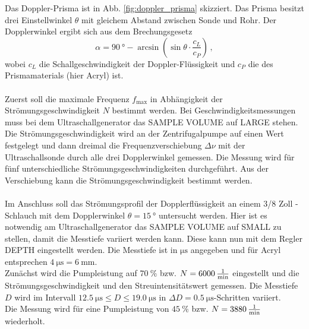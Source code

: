 Das Doppler-Prisma ist in Abb. \ref{fig:doppler_prisma} skizziert.
Das Prisma besitzt drei Einstellwinkel $\theta$ mit gleichem Abstand zwischen Sonde und Rohr.
Der Dopplerwinkel ergibt sich aus dem Brechungsgesetz
\begin{equation}
    \alpha = \SI{90}{\degree} - \arcsin \left( \sin \theta \cdot \frac{c_L}{c_P} \right) \, ,
    \label{eqn:dopplerwinkel}
\end{equation}
wobei $c_L$ die Schallgeschwindigkeit der Doppler-Flüssigkeit und $c_P$ die des Prismamaterials (hier Acryl) ist.
\\
\\
Zuerst soll die maximale Frequenz $f_\text{max}$ in Abhängigkeit der Strömungsgeschwindigkeit $N$ bestimmt werden.
Bei Geschwindigkeitsmessungen muss bei dem Ultraschallgenerator das SAMPLE VOLUME auf LARGE stehen.
Die Strömungsgeschwindigkeit wird an der Zentrifugalpumpe auf einen Wert festgelegt und dann dreimal die Frequenzverschiebung $\Delta \nu$ mit der Ultraschallsonde durch alle drei Dopplerwinkel gemessen.
Die Messung wird für fünf unterschiedliche Strömungsgeschwindigkeiten durchgeführt.
Aus der Verschiebung kann die Strömungsgeschwindigkeit bestimmt werden.
\\
\\
Im Anschluss soll das Strömungsprofil der Dopplerflüssigkeit an einem 3/8 Zoll -Schlauch mit dem Dopplerwinkel $\theta = \SI{15}{\degree}$ untersucht werden.
Hier ist es notwendig am Ultraschallgenerator das SAMPLE VOLUME auf SMALL zu stellen, damit die Messtiefe variiert werden kann.
Diese kann nun mit dem Regler DEPTH eingestellt werden.
Die Messtiefe ist in $\si{\micro\second}$ angegeben und für Acryl entsprechen $\SI{4}{\micro\second} = \SI{6}{\milli\metre}$.\\
Zunächst wird die Pumpleistung auf $\SI{70}{\percent}$ bzw. $N = \SI{6000}{\frac{1}{\minute}}$ eingestellt und die Strömungsgeschwindigkeit und den Streuintensitätswert gemessen.
Die Messtiefe $D$ wird im Intervall $\SI{12.5}{\micro\second} \leq D \leq \SI{19.0}{\micro\second}$ in $\Delta D = \SI{0.5}{\micro\second}$-Schritten variiert.\\
Die Messung wird für eine Pumpleistung von $\SI{45}{\percent}$ bzw. $N = \SI{3880}{\frac{1}{\minute}}$ wiederholt.